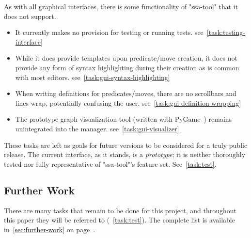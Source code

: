 As with all graphical interfaces,
  there is some functionality of "ssa-tool" that it does not support.
\begin{itemize}
\providecommand\TaskRef[1]{\hfill\mbox{see~\autoref{task:#1}}}
\item It currently makes no provision for testing or running tests.
  \TaskRef{testing-interface}
\item While it does provide templates upon predicate\slash move creation,
  it does not provide any form of syntax highlighting during their creation
  as is common with most editors.
  \TaskRef{gui-syntax-highlighting}
\item When writing definitions for predicates\slash moves,
  there are no scrollbars and lines wrap, potentially confusing the user.
  \TaskRef{gui-definition-wrapping}
\item The prototype graph visualization tool
  (written with PyGame~\autocite{pygame})
  remains unintegrated into the manager.
  \TaskRef{gui-visualizer}
\end{itemize}
These tasks are left as goals for future versions to be considered for a truly public release.
The current interface, as it stands, is a \emph{prototype}; it is neither thoroughly tested
  nor fully representative of "ssa-tool"'s feature-set.
See~\autoref{task:test}.

\subsection{Further Work}
There are many tasks that remain to be done for this project,
  and throughout this paper they will be referred to (\eg~\autoref{task:test}).
The complete list is available in~\autoref{sec:further-work} on page~\pageref{sec:further-work}.

